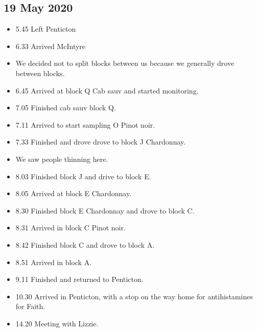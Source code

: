 \documentclass[11pt,letter]{article}
\newenvironment{smitemize}{
\begin{itemize}
  \setlength{\itemsep}{0pt}
  \setlength{\parskip}{0.8pt}
  \setlength{\parsep}{0pt}}
{\end{itemize}
}
\begin{document}
\subsection{19 May 2020}
\begin{smitemize}
\item 5.45 Left Penticton
\item 6.33 Arrived McIntyre
\item We decided not to split blocks between us because we generally drove between blocks.
\item 6.45 Arrived at block Q Cab sauv and started monitoring.
\item 7.05 Finished cab sauv block Q.
\item 7.11 Arrived to start sampling O Pinot noir.
\item 7.33 Finished and drove drove to block J Chardonnay. 
\item We saw people thinning here.
\item 8.03 Finished block J and drive to block E.
\item 8.05 Arrived at block E Chardonnay.
\item 8.30 Finished block E Chardonnay and drove to block C. 
\item 8.31 Arrived in block C Pinot noir. 
\item 8.42 Finished block C and drove to block A.
\item 8.51 Arrived in block A.
\item 9.11 Finished and returned to Penticton.
\item 10.30 Arrived in Penticton, with a stop on the way home for antihistamines for Faith.
\item 14.20 Meeting with Lizzie.  

\end{smitemize}
\end{document}
